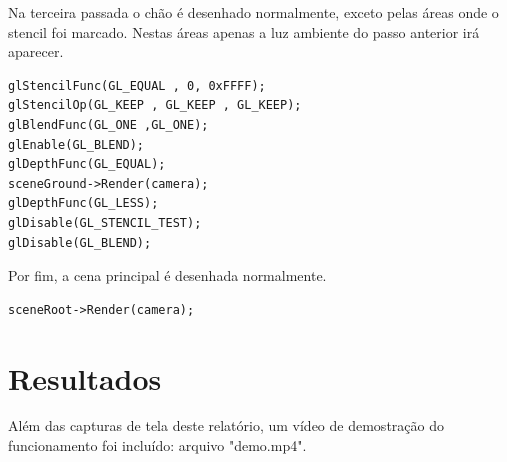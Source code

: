 \documentclass[11pt, a4paper]{article}
\begin{document}
Na terceira passada o chão é desenhado normalmente, exceto pelas áreas onde o 
stencil foi marcado. Nestas áreas apenas a luz ambiente do passo anterior irá 
aparecer.

\begin{verbatim}
glStencilFunc(GL_EQUAL , 0, 0xFFFF);
glStencilOp(GL_KEEP , GL_KEEP , GL_KEEP);
glBlendFunc(GL_ONE ,GL_ONE);
glEnable(GL_BLEND);
glDepthFunc(GL_EQUAL);
sceneGround->Render(camera);
glDepthFunc(GL_LESS);
glDisable(GL_STENCIL_TEST);
glDisable(GL_BLEND);
\end{verbatim}

Por fim, a cena principal é desenhada normalmente.

\begin{verbatim}
sceneRoot->Render(camera);
\end{verbatim}

\section {Resultados}

Além das capturas de tela deste relatório, um vídeo de demostração do funcionamento 
foi incluído: arquivo "demo.mp4".
\end{document}

